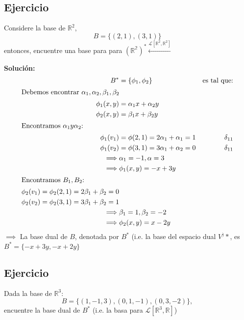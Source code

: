 \documentclass[11pt,fleqn]{book} %
\begin{document}
\subsection{Ejercicio}
\begin{exercise}
Considere la base de $\mathbb{R}^2$,
$$B=\{(2,1),(3,1)\}$$
entonces, encuentre una base para para $(\mathbb{R^2})^{*}\xleftarrow{\mathcal{L}[\mathbb{R}^2,\mathbb{R}^2]}$
\end{exercise}

\textbf{Solución:}
\begin{align}
    B^* &= \{\phi_1,\phi_2\} & \text{es tal que:}\\
    \intertext{Debemos encontrar $\alpha_1,\alpha_2,\beta_1,\beta_2$}
    \phi_1(x,y)&=\alpha_1 x+\alpha_2 y\\ 
    \phi_2(x,y)&=\beta_1 x+\beta_2 y\\
    \intertext{Encontramos $\alpha_1 y \alpha_2$:}
    \phi_1(v_1)&=\phi(2,1)=2\alpha_1+\alpha_1=1  & \delta_{11}\\
    \phi_1(v_2)&=\phi(3,1)=3\alpha_1+\alpha_2=0  & \delta_{11}\\
    \implies &\alpha_1=-1, \alpha=3\\
    \implies & \phi_1(x,y)=-x+3y\\
    \intertext{Encontramos $B_1,B_2$:}
    \phi_2(v_1)=\phi_2(2,1)= 2\beta_1+\beta_2 =0\\ 
    \phi_2(v_2)=\phi_2(3,1)= 3\beta_1+\beta_2 =1\\
    \implies & \beta_1=1,\beta_2=-2\\
    \implies &\phi_2(x,y) =x -2y 
\end{align}
$\implies$ La base dual de $B$, denotada por $B^*$ (i.e. la base del espacio dual $V^)*$, es \\$B^{*}=\{-x+3y,-x+2y\}$

\subsection{Ejercicio}
\begin{exercise}
Dada la base de $\mathbb{R}^3$:\\
$$B=\{(1,-1,3),(0,1,-1),(0,3,-2)\},$$
encuentre la base dual de $B^*$ (i.e. la basa para $\mathcal{L}[\mathbb{R}^3,\mathbb{R}]$)
\end{exercise}
\end{document}
